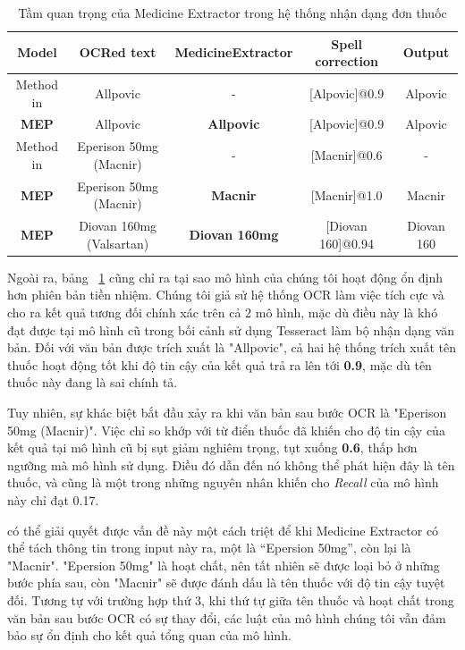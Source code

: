 \begin{table}
\centering
\caption{Tầm quan trọng của Medicine Extractor trong hệ thống nhận dạng đơn thuốc}\label{exp:tab_2}
\begin{adjustbox}{angle=-90}
\begin{tabular}{|c|c|c|c|c|}
\hline
Model           & OCRed text & MedicineExtractor & Spell correction & Output \\ 
\hline
Method in \cite{nguyen2021developing}      & Allpovic & - & [Alpovic]@0.9 & Alpovic     \\ 
\textbf{MEP} & Allpovic & \textbf{Allpovic} & [Alpovic]@0.9 & Alpovic     \\
\hline
Method in \cite{nguyen2021developing}      & Eperison 50mg (Macnir) & - & [Macnir]@0.6 & -      \\ 
\textbf{MEP} & Eperison 50mg (Macnir) & \textbf{Macnir} & [Macnir]@1.0 & Macnir     \\
\hline
\textbf{MEP} & Diovan 160mg (Valsartan) & \textbf{Diovan 160mg} & [Diovan 160]@0.94 & Diovan 160     \\
\hline
\end{tabular}
\end{adjustbox}
\end{table}

Ngoài ra, bảng ~\ref{exp:tab_2} cũng chỉ ra tại sao mô hình của chúng tôi hoạt động ổn định hơn phiên bản tiền nhiệm. Chúng tôi giả sử hệ thống OCR làm việc tích cực và cho ra kết quả tương đối chính xác trên cả 2 mô hình, mặc dù điều này là khó đạt được tại mô hình cũ trong bối cảnh sử dụng Tesseract làm bộ nhận dạng văn bản. Đối với văn bản được trích xuất là "Allpovic", cả hai hệ thống trích xuất tên thuốc hoạt động tốt khi độ tin cậy của kết quả trả ra lên tới \textbf{0.9}, mặc dù tên thuốc này đang là sai chính tả.

Tuy nhiên, sự khác biệt bắt đầu xảy ra khi văn bản sau bước OCR là "Eperison 50mg (Macnir)". Việc chỉ so khớp với từ điển thuốc đã khiến cho độ tin cậy của kết quả tại mô hình cũ bị sụt giảm nghiêm trọng, tụt xuống \textbf{0.6}, thấp hơn ngưỡng mà mô hình sử dụng. Điều đó dẫn đến nó không thể phát hiện đây là tên thuốc, và cũng là một trong những nguyên nhân khiến cho \textit{Recall} của mô hình này chỉ đạt 0.17.

 có thể giải quyết được vấn đề này một cách triệt để khi Medicine Extractor có thể tách thông tin trong input này ra, một là “Epersion 50mg”, còn lại là "Macnir". "Epersion 50mg" là hoạt chất, nên tất nhiên sẽ được loại bỏ ở những bước phía sau, còn "Macnir" sẽ được đánh dấu là tên thuốc với độ tin cậy tuyệt đối. Tương tự với trường hợp thứ 3, khi thứ tự giữa tên thuốc và hoạt chất trong văn bản sau bước OCR có sự thay đổi, các luật của mô hình chúng tôi vẫn đảm bảo sự ổn định cho kết quả tổng quan của mô hình.

